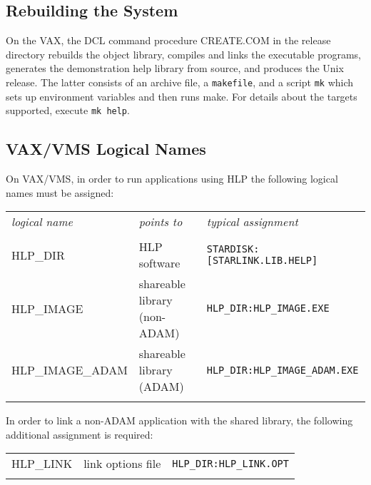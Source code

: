 \documentclass[11pt,nolof]{starlink}
\begin{document}
\subsection{Rebuilding the System}
On the VAX, the DCL command procedure CREATE.COM in the release
directory rebuilds the object
library, compiles and links the executable programs, generates
the demonstration help library from source, and produces the
Unix release.  The latter consists of an archive file, a \texttt{makefile},
and a script \texttt{mk} which sets up environment variables and
then runs make.  For details about the targets supported, execute
\texttt{mk help}.

\subsection{VAX/VMS Logical Names}
On VAX/VMS, in order to run applications using HLP the following
logical names must be assigned:

\begin{tabular}{lll}
\\
 \textit{logical name} & \textit{points to} & \textit{typical assignment} \\ \\
 HLP\_DIR & HLP software & \texttt{STARDISK:[STARLINK.LIB.HELP]} \\
 HLP\_IMAGE & shareable library (non-ADAM) &
                               \texttt{HLP\_DIR:HLP\_IMAGE.EXE} \\
 HLP\_IMAGE\_ADAM & shareable library (ADAM) &
                                 \texttt{HLP\_DIR:HLP\_IMAGE\_ADAM.EXE} \\ \\
\end{tabular}

In order to link a non-ADAM application with the shared library, the
following additional assignment is required:

\begin{tabular}{lll}
\\
 HLP\_LINK & link options file & \texttt{HLP\_DIR:HLP\_LINK.OPT} \\ \\
\end{tabular}
\end{document}
